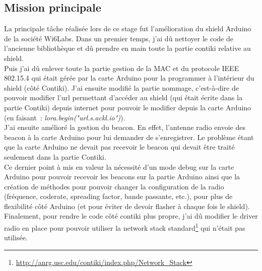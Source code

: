 \documentclass{article}
\begin{document}
\subsection{Mission principale}
La principale tâche réalisée lors de ce stage fut l'amélioration du shield Arduino de la société Wi6Labs. 
Dans un premier temps, j'ai dû nettoyer le code de l'ancienne bibliothèque et dû prendre en main toute la partie contiki relative au shield.\\
Puis j'ai dû enlever toute la partie gestion de la MAC et du protocole IEEE 802.15.4 qui était gérée par la carte Arduino pour la programmer à l'intérieur du shield (côté Contiki). J'ai ensuite modifié la partie nommage, c'est-à-dire de pouvoir modifier l'url permettant d'accéder au shield (qui était écrite dans la partie Contiki) depuis internet pour pouvoir le modifier depuis la carte Arduino (en faisant~: \emph{lora.begin("url.s.ackl.io")}).\\
J'ai ensuite amélioré la gestion du beacon. En effet, l'antenne radio envoie des beacon à la carte Arduino pour lui demander de s'enregistrer. Le problème étant que la carte Arduino ne devait pas recevoir le beacon qui devait être traité seulement dans la partie Contiki.\\
Ce dernier point à mis en valeur la nécessité d'un mode debug sur la carte Arduino pour pouvoir recevoir les beacons sur la partie Arduino ainsi que la création de méthodes pour pouvoir changer la configuration de la radio (fréquence, coderate, spreading factor, bande passante, etc.), pour plus de flexibilité côté Arduino (et pour éviter de devoir flasher à chaque fois le shield).\\
Finalement, pour rendre le code côté contiki plus propre, j'ai dû modifier le driver radio en place pour pouvoir utiliser la network stack standard\footnote{\url{http://anrg.usc.edu/contiki/index.php/Network_Stack}} qui n'était pas utilisée.\\
\end{document}
